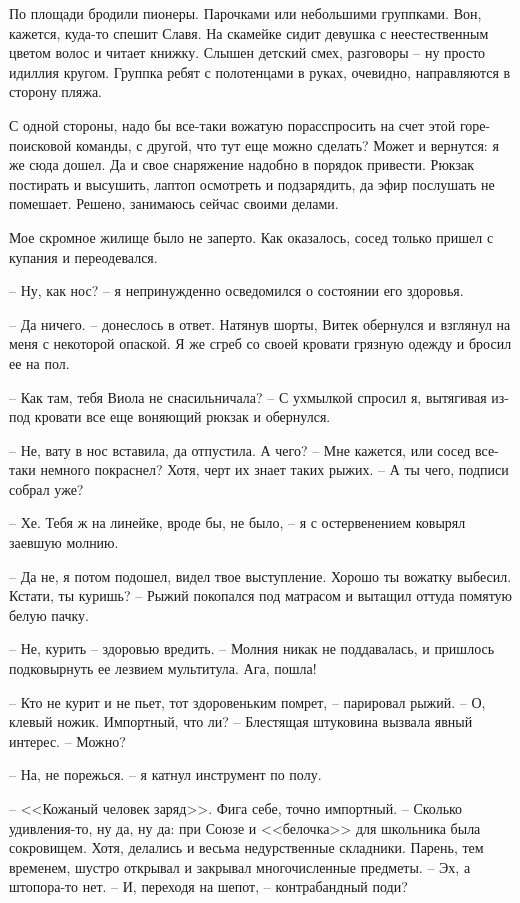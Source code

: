 \documentclass[a4paper]{book}
\begin{document}
По площади бродили пионеры. Парочками или небольшими группками. Вон, кажется, куда-то спешит Славя. На скамейке сидит девушка с неестественным цветом волос и читает книжку. Слышен детский смех, разговоры -- ну просто идиллия кругом. Группка ребят с полотенцами в руках, очевидно, направляются в сторону пляжа.

С одной стороны, надо бы все-таки вожатую порасспросить на счет этой горе-поисковой команды, с другой, что тут еще можно сделать? Может и вернутся: я же сюда дошел. Да и свое снаряжение надобно в порядок привести. Рюкзак постирать и высушить, лаптоп осмотреть и подзарядить, да эфир послушать не помешает. Решено, занимаюсь сейчас своими делами. 

Мое скромное жилище было не заперто. Как оказалось, сосед только пришел с купания и переодевался. 

-- Ну, как нос? -- я непринужденно осведомился о состоянии его здоровья.

-- Да ничего. -- донеслось в ответ. Натянув шорты, Витек обернулся и взглянул на меня с некоторой опаской. Я же сгреб со своей кровати грязную одежду и бросил ее на пол. 

-- Как там, тебя Виола не снасильничала? -- С ухмылкой спросил я, вытягивая из-под кровати все еще воняющий рюкзак и обернулся. 

-- Не, вату в нос вставила, да отпустила. А чего? -- Мне кажется, или сосед все-таки немного покраснел? Хотя, черт их знает таких рыжих. -- А ты чего, подписи собрал уже? 

-- Хе. Тебя ж на линейке, вроде бы, не было, -- я с остервенением ковырял заевшую молнию.

-- Да не, я потом подошел, видел твое выступление. Хорошо ты вожатку выбесил. Кстати, ты куришь? -- Рыжий покопался под матрасом и вытащил оттуда помятую белую пачку. 

-- Не, курить -- здоровью вредить. -- Молния никак не поддавалась, и пришлось подковырнуть ее лезвием мультитула. Ага, пошла!

-- Кто не курит и не пьет, тот здоровеньким помрет, -- парировал рыжий. -- О, клевый ножик. Импортный, что ли? -- Блестящая штуковина вызвала явный интерес. -- Можно?

-- На, не порежься. -- я катнул инструмент по полу.

-- <<Кожаный человек заряд>>. Фига себе, точно импортный. -- Сколько удивления-то, ну да, ну да: при Союзе и <<белочка>> для школьника была сокровищем. Хотя, делались и весьма недурственные складники. Парень, тем временем, шустро открывал и закрывал многочисленные предметы. -- Эх, а штопора-то нет. -- И, переходя на шепот, -- контрабандный поди?
\end{document}
